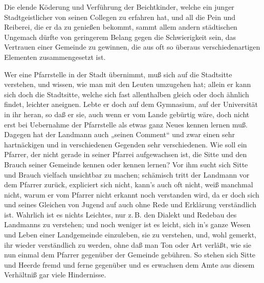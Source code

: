 Die elende Köderung und Verführung der Beichtkinder, welche ein junger Stadtgeistlicher von seinen Collegen zu erfahren hat, und all die Pein und Reiberei, die er da zu genießen bekommt, sammt allem andern städtischen Ungemach dürfte von geringerem Belang gegen die Schwierigkeit sein, das Vertrauen einer Gemeinde zu gewinnen, die aus oft so überaus verschiedenartigen Elementen zusammengesetzt ist.

Wer eine Pfarrstelle in der Stadt übernimmt, muß sich auf die Stadtsitte verstehen, und wissen, wie man mit den Leuten umzugehen hat; allein er kann sich doch die Stadtsitte, welche sich fast allenthalben gleich oder doch ähnlich findet, leichter aneignen. Lebte er doch auf dem Gymnasium, auf der Universität in ihr heran, so daß er sie, auch wenn er vom Lande gebürtig wäre, doch nicht erst bei Uebernahme der Pfarrstelle als etwas ganz Neues kennen lernen
muß. Dagegen hat der Landmann auch „seinen Comment“ und zwar einen sehr hartnäckigen und in verschiedenen Gegenden sehr verschiedenen. Wie soll ein Pfarrer, der nicht gerade in seiner Pfarrei aufgewachsen ist, die Sitte und den Brauch seiner Gemeinde kennen oder kennen lernen? Vor ihm sucht sich Sitte und Brauch vielfach unsichtbar zu machen; schämisch tritt der Landmann vor dem Pfarrer zurück, expliciert sich nicht, kann’s auch oft nicht, weiß manchmal nicht, warum er vom Pfarrer nicht erkannt noch verstanden wird, da er doch sich und seines Gleichen von Jugend auf auch ohne Rede und Erklärung verständlich ist. Wahrlich ist es nichts Leichtes, nur z.\,B. den Dialekt und Redebau des Landmanns zu verstehen; und noch weniger ist es leicht, sich in’s ganze Wesen und Leben einer Landgemeinde einzuleben, sie zu verstehen, und, wohl gemerkt, ihr wieder verständlich zu werden, ohne daß man Ton oder Art verläßt, wie sie nun einmal dem Pfarrer gegenüber der Gemeinde gebühren. So stehen sich Sitte und Heerde fremd und ferne gegenüber und es erwachsen dem Amte aus diesem Verhältniß gar viele Hindernisse.

